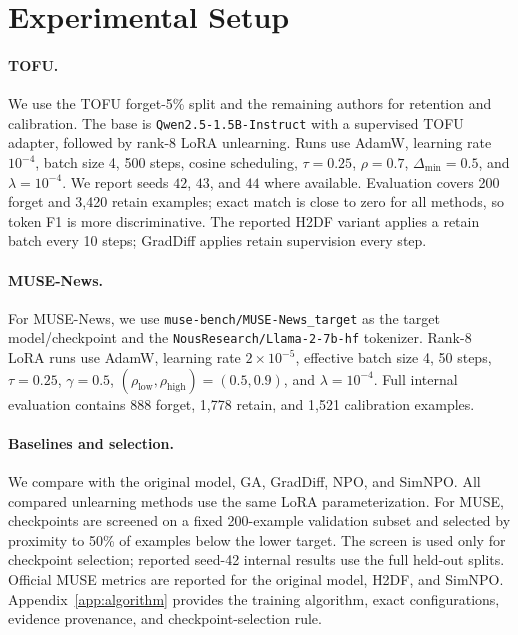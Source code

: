 \documentclass[10pt,twocolumn]{article}
\newcommand{\method}{\textsc{H2DF}}
\begin{document}
\section{Experimental Setup}
\label{sec:setup}

\paragraph{TOFU.}
We use the TOFU forget-5\% split and the remaining authors for retention and
calibration. The base is \texttt{Qwen2.5-1.5B-Instruct} with a supervised TOFU
adapter, followed by rank-8 LoRA unlearning. Runs use AdamW, learning rate
$10^{-4}$, batch size 4, 500 steps, cosine scheduling, $\tau=0.25$, $\rho=0.7$,
$\Delta_{\min}=0.5$, and $\lambda=10^{-4}$. We report seeds $42$, $43$, and $44$
where available. Evaluation covers 200 forget and 3,420 retain examples; exact
match is close to zero for all methods, so token F1 is more discriminative. The
reported \method{} variant applies a retain batch every 10 steps; GradDiff
applies retain supervision every step.

\paragraph{MUSE-News.}
For MUSE-News, we use \nolinkurl{muse-bench/MUSE-News_target} as the target
model/checkpoint and the \nolinkurl{NousResearch/Llama-2-7b-hf} tokenizer. Rank-8
LoRA runs use AdamW, learning rate $2\times10^{-5}$, effective batch size 4, 50
steps, $\tau=0.25$, $\gamma=0.5$,
$(\rho_{\mathrm{low}},\rho_{\mathrm{high}})=(0.5,0.9)$, and $\lambda=10^{-4}$.
Full internal evaluation contains 888 forget, 1,778 retain, and 1,521 calibration
examples.

\paragraph{Baselines and selection.}
We compare with the original model, GA, GradDiff, NPO, and SimNPO. All compared
unlearning methods use the same LoRA parameterization. For MUSE, checkpoints are
screened on a fixed 200-example validation subset and selected by proximity to
50\% of examples below the lower target. The screen is used only for checkpoint
selection; reported seed-42 internal results use the full held-out splits.
Official MUSE metrics are reported for the original model, \method, and SimNPO.
Appendix~\ref{app:algorithm} provides the training algorithm, exact
configurations, evidence provenance, and checkpoint-selection rule.
\end{document}
